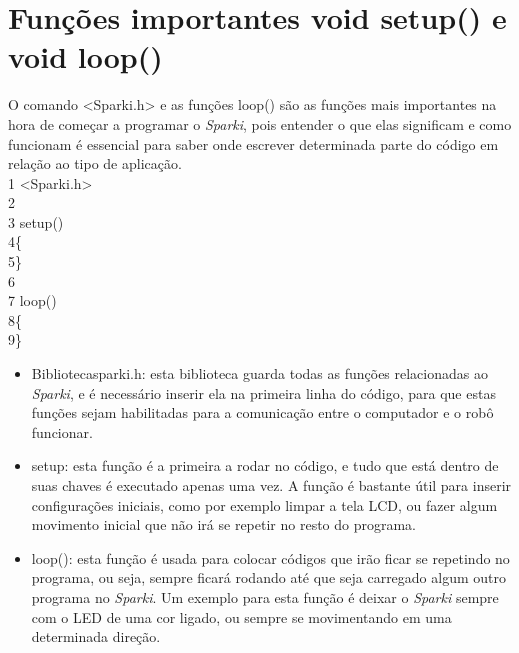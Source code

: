 \documentclass[conference]{IEEEtran}
\begin{document}
\section{\textbf{Funções importantes void setup() e void loop()}}
    \par
    O comando { <Sparki.h>} e as funções { loop()} são as funções mais importantes na hora de começar a programar o \textit{Sparki}, pois entender o que elas significam e como funcionam é essencial para saber onde escrever determinada parte do código em relação ao tipo de aplicação.
    \\
    {\selectfont 
    {\color{cinza}1} <Sparki.h>\\
    {\color{cinza}2}\\
    {\color{cinza}3} setup()\\
    {\color{cinza}4}\quad\{\\
    {\color{cinza}5}\quad\}\\
    {\color{cinza}6}\\
    {\color{cinza}7} loop()\\
    {\color{cinza}8}\quad\{\\
    {\color{cinza}9}\quad\}
    }\\
   \begin{itemize}
       \item Biblioteca{\selectfont sparki.h}: esta biblioteca guarda todas as funções relacionadas ao \textit{Sparki}, e é necessário inserir ela na primeira linha do código, para que estas funções sejam habilitadas para a comunicação entre o computador e o robô funcionar.
       \item { setup}: esta função é a primeira a rodar no código, e tudo que está dentro de suas chaves é executado apenas uma vez. A função é bastante útil para inserir configurações iniciais, como por exemplo limpar a tela LCD, ou fazer algum movimento inicial que não irá se repetir no resto do programa.
       \item { loop()}: esta função é usada para colocar códigos que irão ficar se repetindo no programa, ou seja, sempre ficará rodando até que seja carregado algum outro programa no \textit{Sparki}. Um exemplo para esta função é deixar o \textit{Sparki} sempre com o LED de uma cor ligado, ou sempre se movimentando em uma determinada direção.
   \end{itemize}
\end{document}
